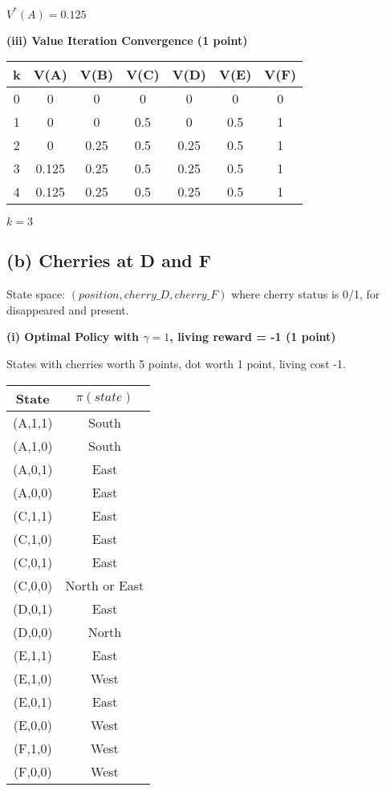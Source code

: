 \documentclass[11pt]{article}
\begin{document}
$\boxed{V^*(A) = 0.125}$

\textbf{(iii) Value Iteration Convergence (1 point)}

\begin{center}
\begin{tabular}{|c|c|c|c|c|c|c|}
\hline
k & V(A) & V(B) & V(C) & V(D) & V(E) & V(F) \\
\hline
0 & 0 & 0 & 0 & 0 & 0 & 0 \\
1 & 0 & 0 & 0.5 & 0 & 0.5 & 1 \\
2 & 0 & 0.25 & 0.5 & 0.25 & 0.5 & 1 \\
3 & 0.125 & 0.25 & 0.5 & 0.25 & 0.5 & 1 \\
4 & 0.125 & 0.25 & 0.5 & 0.25 & 0.5 & 1 \\
\hline
\end{tabular}
\end{center}

$\boxed{k = 3}$

\subsection{(b) Cherries at D and F}
State space: $(position, cherry\_D, cherry\_F)$ where cherry status is 0/1, for disappeared and present.

\textbf{(i) Optimal Policy with $\gamma=1$, living reward = -1 (1 point)}

States with cherries worth 5 points, dot worth 1 point, living cost -1.

\begin{center}
\begin{tabular}{|c|c|}
\hline
State & $\pi(state)$ \\
\hline
(A,1,1) & South \\
(A,1,0) & South \\
(A,0,1) & East \\
(A,0,0) & East \\
(C,1,1) & East \\
(C,1,0) & East \\
(C,0,1) & East \\
(C,0,0) & North or East \\
(D,0,1) & East \\
(D,0,0) & North \\
(E,1,1) & East \\
(E,1,0) & West \\
(E,0,1) & East \\
(E,0,0) & West \\
(F,1,0) & West \\
(F,0,0) & West \\
\hline
\end{tabular}
\end{center}
\end{document}
